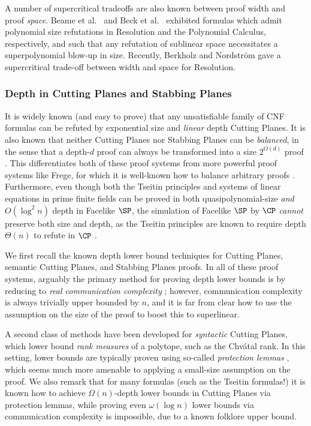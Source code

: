 A number of supercritical tradeoffs are also known between proof width and proof \emph{space}. %
Beame et al.~\cite{BeameBI12} and Beck et al.~\cite{BeckNT13} exhibited formulas which admit polynomial size refutations in Resolution and the
Polynomial Calculus, respectively, 
and such that any refutation of %
sublinear %
space necessitates a superpolynomial blow-up in size. Recently, Berkholz and Nordstr\"{o}m \cite{BerkholzN20} gave a supercritical trade-off between width and space for Resolution. 


\subsubsection{Depth in Cutting Planes and Stabbing Planes} It is widely known (and easy to prove) that any unsatisfiable family of CNF formulas can be refuted by exponential size and \emph{linear} depth Cutting Planes.
It is also known that neither Cutting Planes nor Stabbing Planes can be \emph{balanced}, in the sense that a depth-$d$ proof can always be transformed into a size $2^{O(d)}$ proof \cite{BeameFIKPPR18, BGHMP06}.
This differentiates both of these proof systems from more powerful proof systems like Frege, for which it is well-known how to balance arbitrary proofs \cite{CookR79}.
Furthermore, even though both the Tseitin principles and systems of linear equations in prime finite fields can be proved in both quasipolynomial-size \emph{and} $O(\log^2 n)$ depth in Facelike $\SP$, the simulation of Facelike $\SP$ by $\CP$ \emph{cannot} preserve both size and depth, as the Tseitin principles are known to require depth $\Theta(n)$ to refute in $\CP$ \cite{BGHMP06}.

We first recall the known depth lower bound techniques for Cutting Planes, semantic Cutting Planes, and Stabbing Planes proofs. 
In all of these proof systems, arguably the primary method for proving depth lower bounds is by reducing to \emph{real communication complexity} \cite{ipu:cp,BeameFIKPPR18}; however, communication complexity is always trivially upper bounded by $n$, and it is far from clear how to use the assumption on the size of the proof to boost this to superlinear.

A second class of methods have been developed for \emph{syntactic} Cutting Planes, which lower bound \emph{rank measures} of a polytope, such as the Chv\'{a}tal rank. In this setting, lower bounds are typically proven using so-called \emph{protection lemmas} \cite{BGHMP06}, which seems much more amenable to applying a small-size assumption on the proof. We also remark that for many formulas (such as the Tseitin formulas!) it is known how to achieve $\Omega(n)$-depth lower bounds in Cutting Planes via protection lemmas, while proving even $\omega(\log n)$ lower bounds via communication complexity is impossible, due to a known folklore upper bound. 

